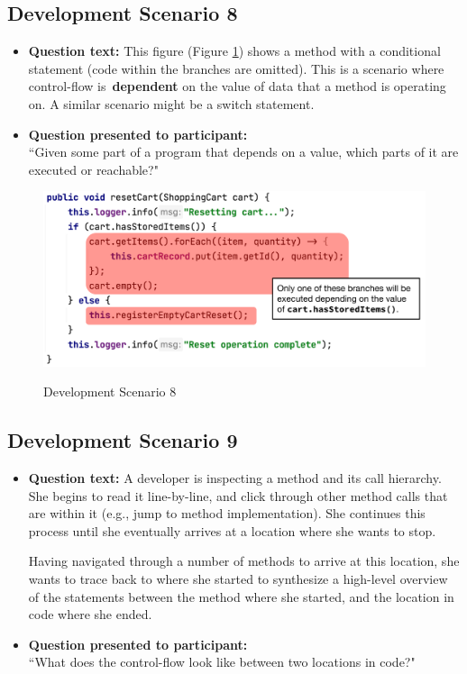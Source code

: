 \subsection{Development Scenario 8}

\begin{itemize}
  \item[] \textbf{Question text:} This figure (Figure \ref{fig:DS8}) shows a 
          method with a conditional statement (code within the branches are 
          omitted). This is a scenario where control-flow is \textbf{dependent} 
          on the value of data that a method is operating on. 
          A similar scenario might be a switch statement.
\item[] \textbf{Question presented to participant:}  \\
         ``Given some part of a program that depends on a value, which parts of 
         it are executed or reachable?"
\end{itemize}

\begin{figure}[ht!]
\centering
\caption{Development Scenario 8}
\includegraphics[width=\textwidth]{./figs/ds8.png}
\label{fig:DS8}
\end{figure}

\pagebreak

\subsection{Development Scenario 9}

\begin{itemize}
  \item[] \textbf{Question text:} A developer is inspecting a method and its 
          call hierarchy. She begins to read it line-by-line, and click through 
          other method calls that are within it (e.g., jump to method 
          implementation). She continues this process until she eventually 
          arrives at a location where she wants to stop.

         \par Having navigated through a number of methods to arrive at this 
         location, she wants to trace back to where she started to synthesize a 
         high-level overview of the statements between the method where she 
         started, and the location in code where she ended.
  \item[] \textbf{Question presented to participant:}  \\
         ``What does the control-flow look like between two locations in code?"
\end{itemize}
